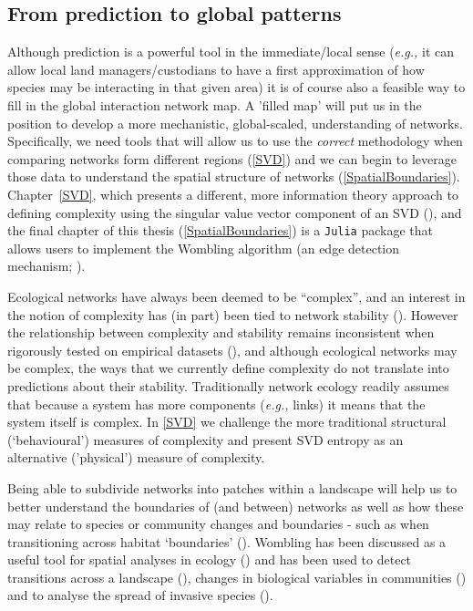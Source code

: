 \begin{refsection}
\subsection{From prediction to global patterns}

Although prediction is a powerful tool in the immediate/local sense 
(\emph{e.g.,} it can allow local land managers/custodians to have a 
first approximation of how species may be interacting in that given area) it is of course also a feasible way to fill in the global interaction network map. A 'filled map' will put us in the position to develop a more mechanistic, global-scaled, understanding of networks. Specifically, we need tools that will allow us to use the \emph{correct} methodology when comparing networks form different regions (\autoref{SVD}) and we can begin to leverage those data to understand the spatial structure of networks (\autoref{SpatialBoundaries}). Chapter~\ref{SVD}, which presents a different, more information theory approach to defining complexity using the singular value vector component of an SVD (\cite{Shannon1948MatThe}), and the final chapter of this thesis (\autoref{SpatialBoundaries}) is a \texttt{Julia} package that allows users to implement the Wombling algorithm (an edge detection mechanism; \cite{Womble1951DifSys}).

Ecological networks have always been deemed to be ``complex'', and an interest in the notion of complexity has (in part) been tied to network stability (\cite{Landi2018Complexity}). However the relationship between complexity and stability remains inconsistent when rigorously tested on empirical datasets (\cite{Jacquet2016NoCom}), and although ecological networks may be complex, the ways that we currently define complexity do not translate into predictions about their stability. Traditionally network ecology readily assumes that because a system has more components (\emph{e.g.,} links) it means that the system itself is complex. In \autoref{SVD} we challenge the more traditional structural (`behavioural') measures of  complexity and present SVD entropy as an alternative ('physical') measure of complexity.

Being able to subdivide networks into patches within a landscape will help us to better understand the boundaries of (and between) networks as well as how these may relate to species or community changes and boundaries - such as when transitioning across habitat `boundaries' (\cite{Hackett2019ResOur}). Wombling has been discussed as a useful tool for spatial analyses in ecology (\cite{Fortin2005SpaAna}) and has been used to detect transitions across a landscape (\cite{Philibert2008SpaStr}), changes in biological variables in communities (\cite{Barbujani1989DetReg}) and to analyse the spread of invasive species (\cite{Fitzpatrick2010EcoBou}).


\end{refsection}
